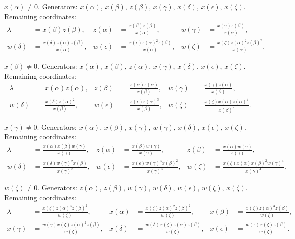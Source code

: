 \documentclass[12pt,letterpaper]{amsart}
\theoremstyle{plain}
\theoremstyle{definition}
\theoremstyle{remark}
\theoremstyle{definition}
\begin{document}
\medskip\noindent
$x(\alpha)\not= 0$. Generators: $x(\alpha)$, $x(\beta)$, $z(\beta)$, $x(\gamma)$,
$x(\delta)$, $x(\epsilon)$, $x(\zeta)$. Remaining coordinates:
\begin{align*}
\lambda&=x(\beta)z(\beta), &
z(\alpha)&=\frac{x(\beta)z(\beta)}{x(\alpha)}, &
w(\gamma)&=\frac{x(\gamma)z(\beta)}{x(\alpha)},\\
w(\delta)&=\frac{x(\delta)z(\alpha)z(\beta)}{x(\alpha)}, &
w(\epsilon)&=\frac{x(\epsilon)z(\alpha)^2 z(\beta)}{x(\alpha)}, &
w(\zeta)&=\frac{x(\zeta)z(\alpha)^2 z(\beta)^2}{x(\alpha)}.
\end{align*}

\medskip\noindent
$x(\beta)\not= 0$. Generators: $x(\alpha)$, $x(\beta)$, $z(\alpha)$, $x(\gamma)$,
$x(\delta)$, $x(\epsilon)$, $x(\zeta)$. Remaining coordinates:
\begin{align*}
\lambda&=x(\alpha)z(\alpha), &
z(\beta)&=\frac{x(\alpha)z(\alpha)}{x(\beta)}, &
w(\gamma)&=\frac{x(\gamma)z(\alpha)}{x(\beta)},\\
w(\delta)&=\frac{x(\delta)z(\alpha)^2}{x(\beta)}, &
w(\epsilon)&=\frac{x(\epsilon)z(\alpha)^3}{x(\beta)}, &
w(\zeta)&=\frac{x(\zeta)x(\alpha)z(\alpha)^4}{x(\beta)^2}.
\end{align*}

\medskip\noindent
$x(\gamma)\not= 0$. Generators: $x(\alpha)$, $x(\beta)$, $x(\gamma)$, $w(\gamma)$,
$x(\delta)$, $x(\epsilon)$, $x(\zeta)$. Remaining coordinates:
\begin{align*}
\lambda&=\frac{x(\alpha)x(\beta)w(\gamma)}{x(\gamma)}, &
z(\alpha)&=\frac{x(\beta)w(\gamma)}{x(\gamma)}, &
z(\beta)&=\frac{x(\alpha)w(\gamma)}{x(\gamma)},\\
w(\delta)&=\frac{x(\delta)w(\gamma)^2 x(\beta)}{x(\gamma)^2}, &
w(\epsilon)&=\frac{x(\epsilon)w(\gamma)^3 x(\beta)^2}{x(\gamma)^3}, &
w(\zeta)&=\frac{x(\zeta)x(\alpha) x(\beta)^2 w(\gamma)^4}{x(\gamma)^4}.
\end{align*}

\medskip\noindent
$w(\zeta)\not= 0$. Generators: $z(\alpha)$, $z(\beta)$, $w(\gamma)$,
$w(\delta)$, $w(\epsilon)$, $w(\zeta)$, $x(\zeta)$. Remaining coordinates:
\begin{align*}
\lambda&=\frac{x(\zeta)z(\alpha)^3 z(\beta)^2}{w(\zeta)}, &
x(\alpha)&=\frac{x(\zeta)z(\alpha)^2 z(\beta)^2}{w(\zeta)}, &
x(\beta)&=\frac{x(\zeta)z(\alpha)^3 z(\beta)}{w(\zeta)},\\
x(\gamma)&=\frac{w(\gamma)x(\zeta) z(\alpha)^2 z(\beta)}{w(\zeta)}, &
x(\delta)&=\frac{w(\delta)x(\zeta) z(\alpha) z(\beta)}{w(\zeta)}, &
x(\epsilon)&=\frac{w(\epsilon)x(\zeta)z(\beta)}{w(\zeta)}.
\end{align*}
\end{document}
